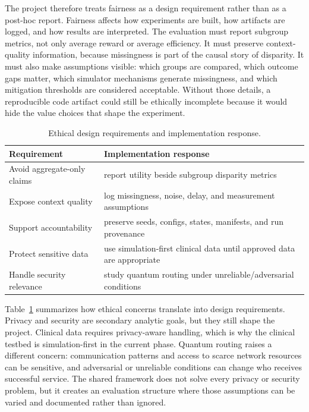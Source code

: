 \documentclass[conference]{IEEEtran}
\begin{document}
The project therefore treats fairness as a design requirement rather than as a
post-hoc report. Fairness affects how experiments are built, how artifacts are
logged, and how results are interpreted. The evaluation must report subgroup
metrics, not only average reward or average efficiency. It must preserve
context-quality information, because missingness is part of the causal story of
disparity. It must also make assumptions visible: which groups are compared,
which outcome gaps matter, which simulator mechanisms generate missingness, and
which mitigation thresholds are considered acceptable. Without those details, a
reproducible code artifact could still be ethically incomplete because it would
hide the value choices that shape the experiment.

\begin{table}[t]
\caption{Ethical design requirements and implementation response.}
\label{tab:ethics}
\centering
\small
\begin{tabular}{p{}p{}}
\toprule
\textbf{Requirement} & \textbf{Implementation response} \\
\midrule
Avoid aggregate-only claims & report utility beside subgroup disparity metrics \\
Expose context quality & log missingness, noise, delay, and measurement assumptions \\
Support accountability & preserve seeds, configs, states, manifests, and run provenance \\
Protect sensitive data & use simulation-first clinical data until approved data are appropriate \\
Handle security relevance & study quantum routing under unreliable/adversarial conditions \\
\bottomrule
\end{tabular}
\end{table}

Table~\ref{tab:ethics} summarizes how ethical concerns translate into design
requirements. Privacy and security are secondary analytic goals, but they still
shape the project. Clinical data requires privacy-aware handling, which is why
the clinical testbed is simulation-first in the current phase. Quantum routing
raises a different concern: communication patterns and access to scarce network
resources can be sensitive, and adversarial or unreliable conditions can change
who receives successful service. The shared framework does not solve every
privacy or security problem, but it creates an evaluation structure where those
assumptions can be varied and documented rather than ignored.
\end{document}
